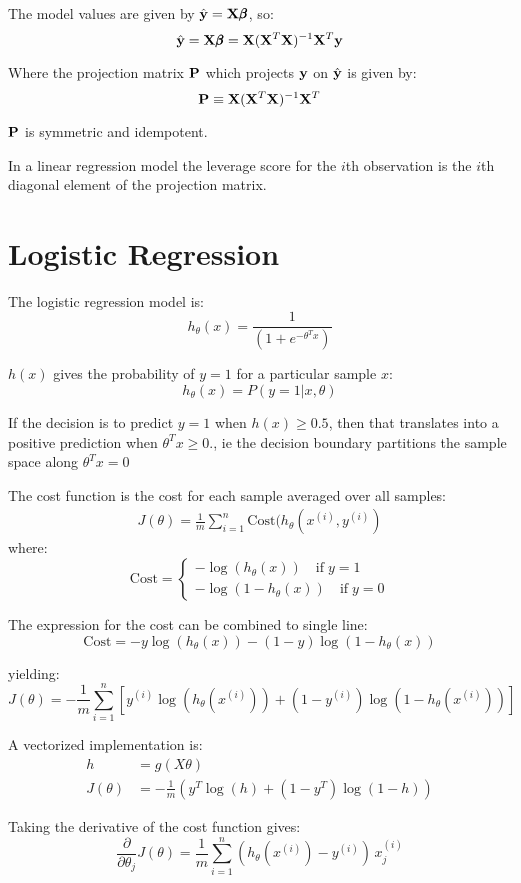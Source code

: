 \documentclass[12pt]{article}
\begin{document}
The model values are given by $\hat{\mathbf{y}} = \mathrm{\mathbf{X}}{\pmb{\beta} } $, so:
\[\hat{\mathbf{y}} = \mathrm{\mathbf{X}} {\pmb{\beta} } = \mathrm{\mathbf{X}} (\mathrm{\mathbf{X}}^T \mathrm{\mathbf{X}})^{-1}\mathrm{\mathbf{X}}^T \mathbf{y} \]

Where the projection matrix ${\mathrm{\mathbf{P} } }$ which projects $\mathbf{y}$ on $\hat {\mathbf{y}}$ is given by:
\[ {\mathrm{\mathbf{P} } } \equiv \mathrm{\mathbf{X}} (\mathrm{\mathbf{X}}^T \mathrm{\mathbf{X}})^{-1}\mathrm{\mathbf{X}}^T\]

${\mathrm{\mathbf{P} } }$ is symmetric and idempotent. 

In a linear regression model the leverage score for the $i$th observation is the $i$th diagonal element of the projection matrix.

\section{Logistic Regression}

The logistic regression model is:
\[
h_{\theta}(x) = \frac{1}{(1+e^{-\theta^T x})}
\]

$h(x)$ gives the probability of $y=1$ for a particular sample $x$: 
\[
h_{\theta}(x) = P(y=1|x,\theta)
\]

If the decision is to predict $y=1$ when $h(x)\ge0.5$, then that translates into a positive prediction when $\theta^T x \ge 0$., ie the decision boundary partitions the sample space along $\theta^T x =0$

The cost function is the cost for each sample averaged over all samples:
\begin{align}
J(\theta) = \frac{1}{m} \sum_{i=1}^n \text{Cost}(h_\theta(x^{(i)}, y^{(i)})
\end{align}
where:
\[
\text{Cost} = 
\begin{cases}
-\log{(h_\theta(x))} \quad \text{if} \; y=1\\
-\log{(1 - h_\theta(x))} \quad \text{if} \;y=0
\end{cases}
\]

The expression for the cost can be combined to single line:
\[
\text{Cost} = -y\log{(h_\theta(x))}  - (1-y)\log{(1 - h_\theta(x))} 
\]

yielding:
\[
J(\theta) = - \frac{1}{m} \sum_{i=1}^n \left[ y^{(i)}\log{(h_\theta(x^{(i)}))}  + (1-y^{(i)})\log{(1 - h_\theta(x^{(i)}))} \right]
\]

A vectorized implementation is:
\begin{align*}
h &= g(X \theta)\\
J(\theta) &= -\frac{1}{m} \left( y^T\log(h) + (1-y^T)\log(1- h)	\right)
\end{align*}

Taking the derivative of the cost function gives:
\[
\frac{\partial}{\partial \theta_j} J(\theta) = \frac{1}{m}\sum_{i=1}^n \left(  h_\theta(x^{(i)}) - y^{(i)}   \right)\,x^{(i)}_j
\]
\end{document}
